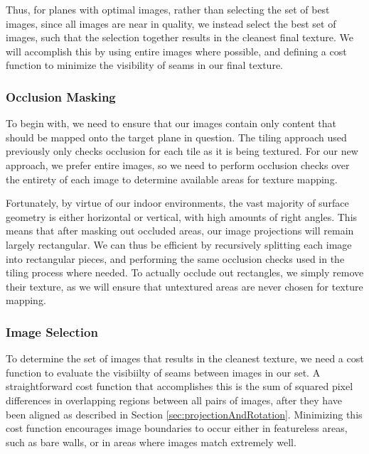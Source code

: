 \documentclass[10pt,twocolumn,letterpaper]{article}
\begin{document}
Thus, for planes with optimal images, rather than selecting the set of
best images, since all images are near in quality, we instead select
the best set of images, such that the selection together results in
the cleanest final texture. We will accomplish this by using entire
images where possible, and defining a cost function to minimize the
visibility of seams in our final texture.

\subsubsection{Occlusion Masking}
\label{sec:occlusionMasking}
To begin with, we need to ensure that our images contain only content
that should be mapped onto the target plane in question. The tiling
approach used previously only checks occlusion for each tile as it is
being textured. For our new approach, we prefer entire images, so we
need to perform occlusion checks over the entirety of each image to
determine available areas for texture mapping.

Fortunately, by virtue of our indoor environments, the vast majority
of surface geometry is either horizontal or vertical, with high
amounts of right angles. This means that after masking out occluded
areas, our image projections will remain largely rectangular. We can
thus be efficient by recursively splitting each image into rectangular
pieces, and performing the same occlusion checks used in the tiling
process where needed. To actually occlude out rectangles, we simply
remove their texture, as we will ensure that untextured areas are
never chosen for texture mapping.

\subsubsection{Image Selection}
\label{sec:imageSelection}
To determine the set of images that results in the cleanest texture,
we need a cost function to evaluate the visibiilty of seams between
images in our set. A straightforward cost function that accomplishes
this is the sum of squared pixel differences in overlapping regions
between all pairs of images, after they have been aligned as described
in Section \ref{sec:projectionAndRotation}. Minimizing this cost
function encourages image boundaries to occur either in featureless
areas, such as bare walls, or in areas where images match extremely
well.
\end{document}
